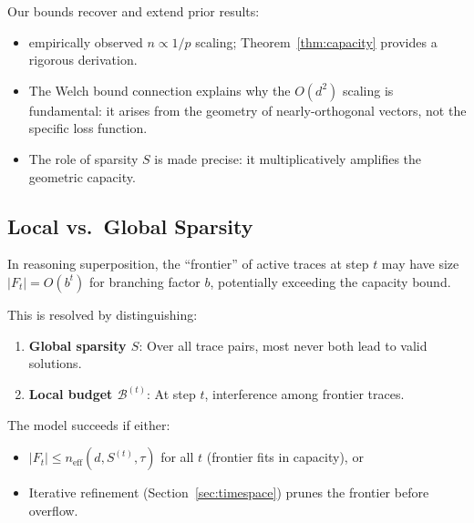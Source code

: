 \begin{remark}
\label{rem:prior}
Our bounds recover and extend prior results:
\begin{itemize}
    \item \citet{elhage2022toy} empirically observed $n \propto 1/p$ scaling; Theorem~\ref{thm:capacity} provides a rigorous derivation.
    \item The Welch bound connection explains why the $O(d^2)$ scaling is fundamental: it arises from the geometry of nearly-orthogonal vectors, not the specific loss function.
    \item The role of sparsity $S$ is made precise: it multiplicatively amplifies the geometric capacity.
\end{itemize}
\end{remark}

\subsection{Local vs.\ Global Sparsity}

\begin{remark}
\label{rem:frontier}
In reasoning superposition, the ``frontier'' of active traces at step $t$ may have size $|F_t| = O(b^t)$ for branching factor $b$, potentially exceeding the capacity bound.

This is resolved by distinguishing:
\begin{enumerate}
    \item \textbf{Global sparsity $S$}: Over all trace pairs, most never both lead to valid solutions.
    \item \textbf{Local budget $\mathcal{B}^{(t)}$}: At step $t$, interference among frontier traces.
\end{enumerate}

The model succeeds if either:
\begin{itemize}
    \item $|F_t| \leq n_{\text{eff}}(d, S^{(t)}, \tau)$ for all $t$ (frontier fits in capacity), or
    \item Iterative refinement (Section~\ref{sec:timespace}) prunes the frontier before overflow.
\end{itemize}
\end{remark}

